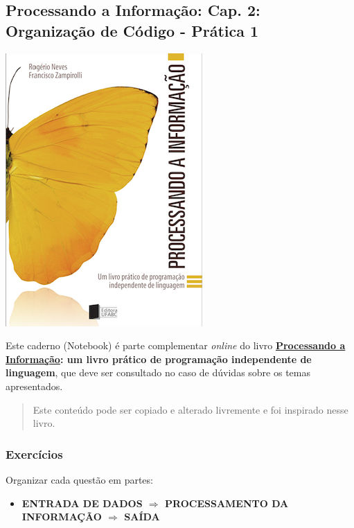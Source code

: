 \documentclass[12pt,a4paper]{article}
\providecommand{\tightlist}{%
      \setlength{\itemsep}{0pt}\setlength{\parskip}{0pt}}
\begin{document}
    \hypertarget{processando-a-informauxe7uxe3o-cap.-2-organizauxe7uxe3o-de-cuxf3digo---pruxe1tica-1}{%
\subsection{Processando a Informação: Cap. 2: Organização de Código -
Prática
1}\label{processando-a-informauxe7uxe3o-cap.-2-organizauxe7uxe3o-de-cuxf3digo---pruxe1tica-1}}

    \includegraphics{"figs/Capa_Processando_Informacao.jpg"}

Este caderno (Notebook) é parte complementar \emph{online} do livro
\textbf{\href{https://editora.ufabc.edu.br/matematica-e-ciencias-da-computacao/58-processando-a-informacao}{Processando
a Informação}: um livro prático de programação independente de
linguagem}, que deve ser consultado no caso de dúvidas sobre os temas
apresentados.

\begin{quote}
Este conteúdo pode ser copiado e alterado livremente e foi inspirado
nesse livro.
\end{quote}

    \hypertarget{exercuxedcios}{%
\subsubsection{Exercícios}\label{exercuxedcios}}

    Organizar cada questão em partes:

\begin{itemize}
\tightlist
\item
  \textbf{ENTRADA DE DADOS \(\Rightarrow\) PROCESSAMENTO DA INFORMAÇÃO
  \(\Rightarrow\) SAÍDA}
\end{itemize}
\end{document}
